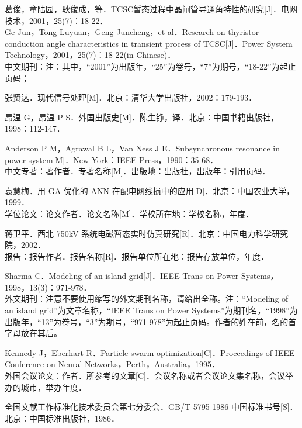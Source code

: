 \documentclass[UTF8,twoside,a4paper,fontset=none]{ctexart}
\begin{document}

\begin{cseebibliography}
\item 葛俊，童陆园，耿俊成，等．TCSC暂态过程中晶闸管导通角特性的研究[J]．电网技术，2001，25(7)：18-22．\\
Ge Jun，Tong Luyuan，Geng Juncheng，et al．Research on thyristor conduction angle characteristics in transient process of TCSC[J]．Power System Technology，2001，25(7)：18-22(in Chinese)．\\
中文期刊：注：其中，“2001”为出版年，“25”为卷号，“7”为期号，“18-22”为起止页码；
\item 张贤达．现代信号处理[M]．北京：清华大学出版社，2002：179-193．
\item 昂温 G，昂温 P S．外国出版史[M]．陈生铮，译．北京：中国书籍出版社，1998：112-147．
\item Anderson P M，Agrawal B L，Van Ness J E．Subsynchronous resonance in power system[M]．New York：IEEE Press，1990：35-68．\\
中文专著：著作者．专著名称[M]．出版地：出版社，出版年：引用页码．
\item 袁慧梅．用 GA 优化的 ANN 在配电网线损中的应用[D]．北京：中国农业大学，1999．\\
学位论文：论文作者．论文名称[M]．学校所在地：学校名称，年度．
\item 蒋卫平．西北 750kV 系统电磁暂态实时仿真研究[R]．北京：中国电力科学研究院，2002．\\
报告：报告作者．报告名称[R]．报告单位所在地：报告存放单位，年度．
\item Sharma C．Modeling of an island grid[J]．IEEE Trans on Power Systems，1998，13(3)：971-978．\\
外文期刊：注意不要使用缩写的外文期刊名称，请给出全称。注：“Modeling of an island grid”为文章名称，“IEEE Trans on Power Systems”为期刊名，“1998”为出版年，“13”为卷号，“3”为期号，“971-978”为起止页码。作者的姓在前，名的首字母放在其后。
\item Kennedy J，Eberhart R．Particle swarm optimization[C]．Proceedings of IEEE Conference on Neural Networks，Perth，Australia，1995．\\
外国会议论文：作者．所参考的文章[C]．会议名称或者会议论文集名称，会议举办的城市，举办年度．
\item 全国文献工作标准化技术委员会第七分委会．GB/T 5795-1986 中国标准书号[S]．北京：中国标准出版社，1986．\\

\end{cseebibliography}
\end{document}
